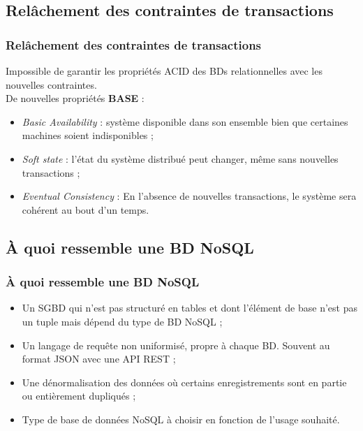 \documentclass[handout]{beamer}
\begin{document}
		\subsection{Relâchement des contraintes de transactions}
		\begin{frame}
			\frametitle{Relâchement des contraintes de transactions}

			Impossible de garantir les propriétés ACID des BDs relationnelles avec les nouvelles contraintes.\\
			\vspace{10px}
			De nouvelles propriétés \textbf{BASE} :
			\begin{itemize}
				\item \textit{Basic Availability} : système disponible dans son ensemble bien que certaines machines soient indisponibles ;
				\item \textit{Soft state} : l'état du système distribué peut changer, même sans nouvelles transactions ;
				\item \textit{Eventual Consistency} : En l'absence de nouvelles transactions, le système sera cohérent au bout d'un temps.
			\end{itemize}

		\end{frame}

		\subsection{À quoi ressemble une BD NoSQL}
		\begin{frame}
			\frametitle{À quoi ressemble une BD NoSQL}

			\begin{itemize}
				\item Un SGBD qui n'est pas structuré en tables et dont l'élément de base n'est pas un tuple mais dépend du type de BD NoSQL ;
				\item Un langage de requête non uniformisé, propre à chaque BD. Souvent au format JSON avec une API REST ;
				\item Une dénormalisation des données où certains enregistrements sont en partie ou entièrement dupliqués ;
				\item Type de base de données NoSQL à choisir en fonction de l'usage souhaité.
			\end{itemize}

		\end{frame}

\end{document}
